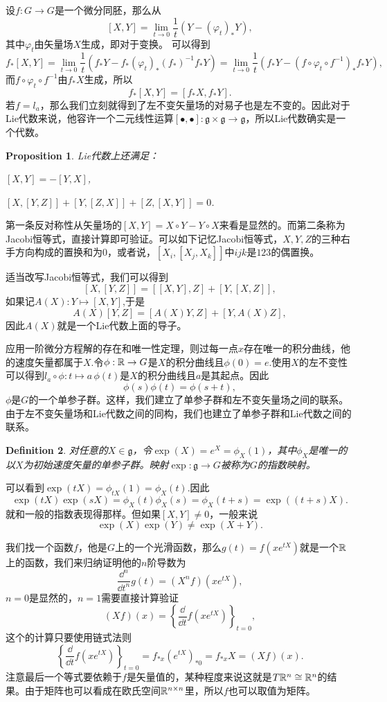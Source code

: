 \documentclass[8pt]{book}
\theoremstyle{plain}
\newtheorem{defi}{Definition}
\newtheorem{pro}[defi]{Proposition}
\newcommand{\lag}{{\mathfrak{g}}}  %
\begin{document}
设$f:G\to G$是一个微分同胚，那么从
\[
	[X,Y]=\lim_{t\to 0}\frac{1}{t}\left(Y-(\varphi_t)_*Y\right),
\]
其中$\varphi_t$由矢量场$X$生成，即对于变换。
可以得到
\[
	f_*[X,Y]=\lim_{t\to 0}\frac{1}{t}\left(f_*Y-f_*(\varphi_t)_*(f_*)^{-1}f_*Y\right)=\lim_{t\to 0}\frac{1}{t}\left(f_*Y-(f\circ\varphi_t\circ f^{-1})_*f_*Y\right),
\]
而$f\circ\varphi_t\circ f^{-1}$由$f_*X$生成，所以
\[
	f_*[X,Y]=[f_*X,f_*Y].
\]
若$f=l_a$，那么我们立刻就得到了左不变矢量场的对易子也是左不变的。因此对于Lie代数来说，他容许一个二元线性运算$[\bullet,\bullet]:\lag\times \lag\to \lag$，所以Lie代数确实是一个代数。
\begin{pro}
Lie代数上还满足：

 $[X,Y]=-[Y,X]$,

 $[X,[Y,Z]]+[Y,[Z,X]]+[Z,[X,Y]]=0$.
\end{pro}
第一条反对称性从矢量场的$[X,Y]=X\circ Y-Y\circ X$来看是显然的。而第二条称为Jacobi恒等式，直接计算即可验证。可以如下记忆Jacobi恒等式，$X,Y,Z$的三种右手方向构成的置换和为$0$，或者说，$[X_i,[X_j,X_k]]$中$ijk$是$123$的偶置换。

适当改写Jacobi恒等式，我们可以得到
\[
[X,[Y,Z]]=[[X,Y],Z]+[Y,[X,Z]],
\]
如果记$A(X):Y\mapsto [X,Y]$,于是
\[
A(X)[Y,Z]=[A(X)Y,Z]+[Y,A(X)Z],
\]
因此$A(X)$就是一个Lie代数上面的导子。

应用一阶微分方程解的存在和唯一性定理，则过每一点$x$存在唯一的积分曲线，他的速度矢量都属于$X$.令$\phi:\mathbb{R}\to G$是$X$的积分曲线且$\phi(0)=e$.使用$X$的左不变性可以得到$l_a\circ \phi:t\mapsto a\,\phi(t)$是$X$的积分曲线且$a$是其起点。因此
\[
\phi(s)\phi(t)=\phi(s+t),
\]
$\phi$是$G$的一个单参子群。这样，我们建立了单参子群和左不变矢量场之间的联系。由于左不变矢量场和Lie代数之间的同构，我们也建立了单参子群和Lie代数之间的联系。

\begin{defi}
对任意的$X\in \lag$，令$\exp(X)=e^X=\phi_X(1)$，其中$\phi_X$是唯一的以$X$为初始速度矢量的单参子群。映射$\exp:\lag\to G$被称为$G$的指数映射。
\end{defi}
可以看到$\exp(tX)=\phi_{tX}(1)=\phi_{X}(t)$.因此
\[
\exp(tX)\exp(sX)=\phi_{X}(t)\phi_{X}(s)=\phi_{X}(t+s)=\exp((t+s)X).
\]
就和一般的指数表现得那样。但如果$[X,Y]\neq 0$，一般来说\[
\exp(X)\exp(Y)\neq \exp(X+Y).
\]

我们找一个函数$f$，他是$G$上的一个光滑函数，那么$g(t)=f(xe^{tX})$就是一个$\mathbb{R}$上的函数，我们来归纳证明他的$n$阶导数为
\[
	\frac{\dd^n}{\dd t^n}g(t)=(X^nf)(x e^{tX}),
\]
$n=0$是显然的，$n=1$需要直接计算验证
\[
	(Xf)(x)=\left\{\frac{\dd}{\dd t}f(x e^{tX})\right\}_{t=0},
\]
这个的计算只要使用链式法则
\[
	\left\{\frac{\dd}{\dd t}f(x e^{tX})\right\}_{t=0}=f_{*x}(e^{tX})_{*0}=f_{*x}X=(Xf)(x).
\]
注意最后一个等式要依赖于$f$是矢量值的，某种程度来说这就是$T\mathbb{R}^n\cong \mathbb{R}^n$的结果。由于矩阵也可以看成在欧氏空间$\mathbb{R}^{n\times n}$里，所以$f$也可以取值为矩阵。
\end{document}
